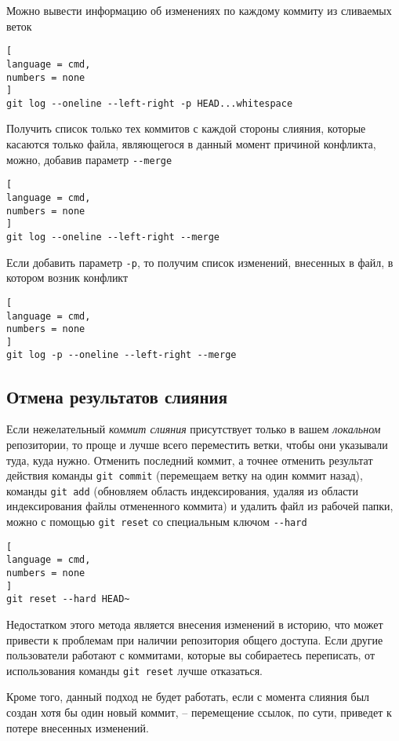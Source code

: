 \documentclass[%
	11pt,
	a4paper,
	utf8,
		]{article}
\begin{document}
Можно вывести информацию об изменениях по каждому коммиту из сливаемых веток
\begin{lstlisting}[
language = cmd,
numbers = none
]
git log --oneline --left-right -p HEAD...whitespace
\end{lstlisting}

Получить список только тех коммитов с каждой стороны слияния, которые касаются только файла, являющегося в данный момент причиной конфликта, можно, добавив параметр \verb|--merge|
\begin{lstlisting}[
language = cmd,
numbers = none
]
git log --oneline --left-right --merge
\end{lstlisting}

Если добавить параметр \texttt{-p}, то получим список изменений, внесенных в файл, в котором возник конфликт
\begin{lstlisting}[
language = cmd,
numbers = none
]
git log -p --oneline --left-right --merge
\end{lstlisting}

\subsection{Отмена результатов слияния}

Если нежелательный \emph{коммит слияния} присутствует только в вашем \emph{локальном} репозитории, то проще и лучше всего переместить ветки, чтобы они указывали туда, куда нужно. Отменить последний коммит, а точнее отменить результат действия команды \texttt{git commit} (перемещаем ветку на один коммит назад), команды \texttt{git add} (обновляем область индексирования, удаляя из области индексирования файлы отмененного коммита) и удалить файл из рабочей папки, можно с помощью \texttt{git reset} со специальным ключом \verb|--hard|
\begin{lstlisting}[
language = cmd,
numbers = none
]
git reset --hard HEAD~
\end{lstlisting}

Недостатком этого метода является внесения изменений в историю, что может привести к проблемам при наличии репозитория общего доступа. Если другие пользователи работают с коммитами, которые вы собираетесь переписать, от использования команды \texttt{git reset} лучше отказаться.

Кроме того, данный подход не будет работать, если с момента слияния был создан хотя бы один новый коммит, -- перемещение ссылок, по сути, приведет к потере внесенных изменений.
\end{document}
